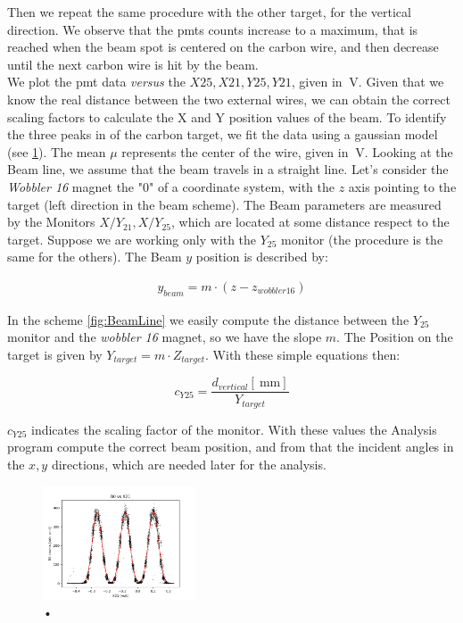  Then we repeat the same procedure with the other target, for the vertical direction. We observe that the pmts counts increase to a maximum, that is reached when the beam spot is centered on the carbon wire, and then decrease until the next carbon wire is hit by the beam.\\
We plot the pmt data \textit{versus} the $X25,X21,Y25,Y21$, given in $\SI{}{\volt}$. 
Given that we know the real distance between the two external wires, we can obtain the correct scaling factors to calculate the X and Y position values ​​of the beam. To identify the three peaks in of the carbon target, we fit the data using a gaussian model (see \ref{fig:HorizontalCalibration}). The mean $\mu$ represents the center of the wire, given in $\SI{}{\volt}$.
Looking at the Beam line, we assume that the beam travels in a straight line. Let's consider the \textit{Wobbler 16} magnet the "$0$" of a coordinate system, with the $z$ axis pointing to the target (left direction in the beam scheme). The Beam parameters are measured by the Monitors $X/Y_{21}, X/Y_{25}$, which are located at some distance respect to the target. Suppose we are working only with the $Y_{25}$ monitor (the procedure is the same for the others). The Beam $y$ position is described by:

\begin{align*}
y_{beam} = m \cdot (z - z_{wobbler 16})
\end{align*}

In the scheme \ref{fig:BeamLine} we easily compute the distance between the $Y_{25}$ monitor and the \textit{wobbler 16} magnet, so we have the slope $m$. The Position on the target is given by $Y_{target} = m \cdot Z_{target}$. With these simple equations then:

\begin{equation}
c_{Y25} = \dfrac{d_{vertical} [\SI{}{\milli \meter}]}{ Y_{target}} 
\end{equation}

$c_{Y25}$ indicates the scaling factor of the monitor. With these values the Analysis program compute the correct beam position, and from that the incident angles in the $x,y$ directions, which are needed later for the analysis.

\begin{figure}[hbtp]
\centering
\includegraphics[width=0.4\textwidth]{Analysis/HorizontalCalibration.png}
\caption{•}
\label{fig:HorizontalCalibration}
\end{figure}

